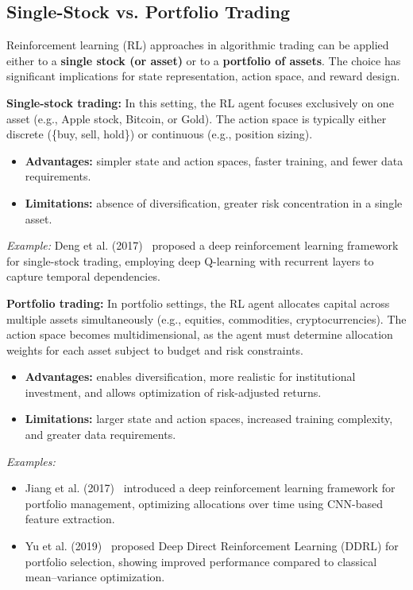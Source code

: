 \documentclass[12pt,a4paper]{report}
\begin{document}
\subsection{Single-Stock vs. Portfolio Trading}

Reinforcement learning (RL) approaches in algorithmic trading can be applied either to a \textbf{single stock (or asset)} or to a \textbf{portfolio of assets}. The choice has significant implications for state representation, action space, and reward design.

\bigskip
\textbf{Single-stock trading:}  
In this setting, the RL agent focuses exclusively on one asset (e.g., Apple stock, Bitcoin, or Gold). The action space is typically either discrete (\{buy, sell, hold\}) or continuous (e.g., position sizing).  
\begin{itemize}
    \item \textbf{Advantages:} simpler state and action spaces, faster training, and fewer data requirements.
    \item \textbf{Limitations:} absence of diversification, greater risk concentration in a single asset.
\end{itemize}
\textit{Example:} Deng et al. (2017)~\cite{deng2017deep} proposed a deep reinforcement learning framework for single-stock trading, employing deep Q-learning with recurrent layers to capture temporal dependencies.

\bigskip
\textbf{Portfolio trading:}  
In portfolio settings, the RL agent allocates capital across multiple assets simultaneously (e.g., equities, commodities, cryptocurrencies). The action space becomes multidimensional, as the agent must determine allocation weights for each asset subject to budget and risk constraints.  
\begin{itemize}
    \item \textbf{Advantages:} enables diversification, more realistic for institutional investment, and allows optimization of risk-adjusted returns.
    \item \textbf{Limitations:} larger state and action spaces, increased training complexity, and greater data requirements.
\end{itemize}
\textit{Examples:}  
\begin{itemize}
    \item Jiang et al. (2017)~\cite{jiang2017deeprl} introduced a deep reinforcement learning framework for portfolio management, optimizing allocations over time using CNN-based feature extraction.  
    \item Yu et al. (2019)~\cite{yu2019deep} proposed Deep Direct Reinforcement Learning (DDRL) for portfolio selection, showing improved performance compared to classical mean–variance optimization.
\end{itemize}
\end{document}
